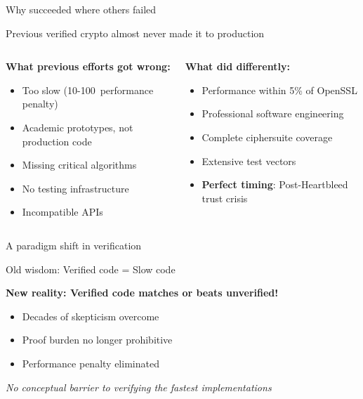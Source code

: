\documentclass[aspectratio=169, lualatex, handout]{beamer}
\begin{document}
\begin{frame}{Why \haclstar succeeded where others failed}
	\begin{center}
		\large
		Previous verified crypto almost never made it to production
	\end{center}
	\vspace{1em}
	\begin{columns}[c]
		\begin{column}{0.5\textwidth}
			\textbf{What previous efforts got wrong:}
			\begin{itemize}
				\item Too slow (10-100\times\ performance penalty)
				\item Academic prototypes, not production code
				\item Missing critical algorithms
				\item No testing infrastructure
				\item Incompatible APIs
			\end{itemize}
		\end{column}
		\begin{column}{0.5\textwidth}
			\textbf{What \haclstar did differently:}
			\begin{itemize}
				\item Performance within 5\% of OpenSSL
				\item Professional software engineering
				\item Complete ciphersuite coverage
				\item Extensive test vectors
				\item \textbf{Perfect timing}: Post-Heartbleed trust crisis
			\end{itemize}
		\end{column}
	\end{columns}
\end{frame}

\begin{frame}{A paradigm shift in verification}
	\begin{center}
		\Large
		Old wisdom: Verified code = Slow code

		\vspace{1em}

		\textbf{New reality: Verified code matches or beats unverified!}
	\end{center}
	\vspace{1em}
	\begin{itemize}
		\item Decades of skepticism overcome
		\item Proof burden no longer prohibitive
		\item Performance penalty eliminated
	\end{itemize}
	\vspace{0.5em}
	\begin{center}
		\textit{No conceptual barrier to verifying the fastest implementations}
	\end{center}
\end{frame}
\end{document}
